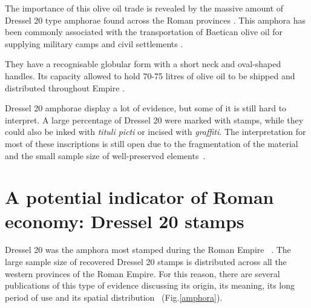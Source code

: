 \documentclass[review]{elsarticle}
\begin{document}
The importance of this olive oil trade is revealed by the massive amount of Dressel 20 type amphorae found across the Roman provinces \citep{dressel_ricerche_1878,
millet_anforas_1998}. This amphora has been commonly associated with the transportation of Baetican olive oil for supplying military camps and civil settlements \citep{berni_millet_epigrafianforica_2008}.

They have a recognisable globular form with a short neck and oval-shaped handles. Its capacity allowed to hold 70-75 litres of olive oil to be shipped and distributed throughout Empire \citep{berni_dressel_2016}.


Dressel 20 amphorae display a lot of evidence, but some of it is still hard to interpret. A large percentage of Dressel 20 were marked with stamps, while they could also be inked with \textit{tituli picti} or incised with \textit{graffiti}. The interpretation for most of these inscriptions is still open due to the fragmentation of the material and the small sample size of well-preserved elements~\citep{aguilera_evolucion_2007,rovira_guardiola_grafitos_2007}. 

 

\section{A potential indicator of Roman economy: Dressel 20 stamps}

Dressel 20 was the amphora most stamped during the Roman Empire ~\citep[18]{millet_anforas_1998}. The large sample size of recovered Dressel 20 stamps is distributed across all the western provinces of the Roman Empire. For this reason, there are several publications of this type of evidence discussing its origin, its meaning, its long period of use and its spatial distribution~\citep{dressel_ricerche_1878,
rodriguez_economioleicola_1977,
chicepi1985,millet_anforas_1998, remesal_sellar_2016} (Fig.\ref{amphora}).
\end{document}
